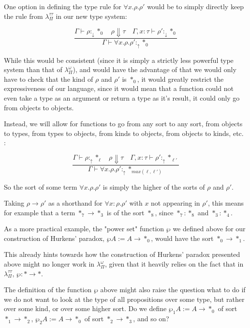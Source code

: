 \documentclass[runningheads]{llncs}
\begin{document}
One option in defining the type rule for $\forall x . \rho . \rho'$ would be to
simply directly keep the rule from $\lambda_\Pi^{\tau \tau}$ in our new type
system:

$$
\frac{\Gamma \vdash \rho :_\downarrow \ast_0 \quad \rho \Downarrow \tau \quad \Gamma , x : \tau \vdash \rho' :_\downarrow \ast_0}
     {\Gamma \vdash \forall x . \rho . \rho' :_\uparrow \ast_0}
$$

While this would be consistent (since it is simply a strictly less powerful type
system than that of $\lambda_\Pi^\omega$), and would have the advantage of that
we would only have to check that the kind of $\rho$ and $\rho'$ is $\ast_0$, it
would greatly restrict the expressiveness of our language, since it would mean
that a function could not even take a type as an argument or return a type as it's
result, it could only go from objects to objects.

Instead, we will allow for functions to go from any sort to any sort, from
objects to types, from types to objects, from kinds to objects, from objects to
kinds, etc. :

$$
\frac{\Gamma \vdash \rho :_\uparrow \ast_\ell \quad \rho \Downarrow \tau \quad \Gamma , x : \tau \vdash \rho' :_\uparrow \ast_{\ell'}}
     {\Gamma \vdash \forall x . \rho . \rho' :_\uparrow \ast_{max(\ell, \ell')}}
$$

So the sort of some term $\forall x . \rho . \rho'$ is simply the higher of the
sorts of $\rho$ and $\rho'$.

Taking $\rho \rightarrow \rho'$ as a shorthand for $\forall x:\rho . \rho'$ with
$x$ not appearing in $\rho'$, this means for example that a term $\ast_7
\rightarrow \ast_3$ is of the sort $\ast_8$, since $\ast_7 : \ast_8$ and $\ast_3
: \ast_4$.

As a more practical example, the "power set" function $\wp$ we defined above for
our construction of Hurkens' paradox, $\wp A := A \rightarrow \ast_0$, would
have the sort $\ast_0 \rightarrow \ast_1$.

This already hints towards how the construction of Hurkens' paradox
presented above might no longer work in $\lambda_\Pi^\omega$, given that it
heavily relies on the fact that in $\lambda_{\Pi}^{\tau \tau}$, $\wp : \ast
\rightarrow \ast$.

The definition of the function $\wp$ above might also raise the question what to
do if we do not want to look at the type of all propositions over some type, but
rather over some kind, or over some higher sort. Do we define $\wp_1 A := A
\rightarrow \ast_0$ of sort $\ast_1 \rightarrow \ast_2$, $\wp_2 A := A
\rightarrow \ast_0$ of sort $\ast_2 \rightarrow \ast_3$, and so on?
\end{document}
